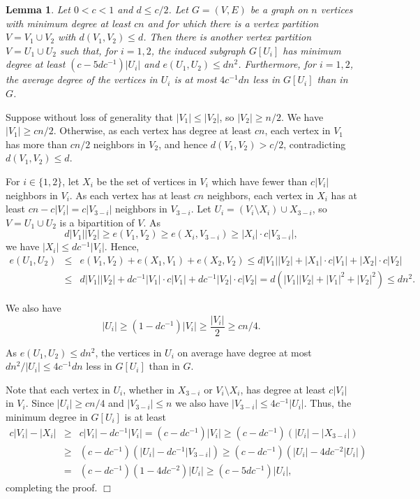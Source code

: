 \documentclass[11pt]{article}
\newtheorem{lemma}[theorem]{Lemma}
\newenvironment{proof}
      {\medskip\noindent{\bf Proof:}\hspace{1mm}}
      {\hfill$\Box$\medskip}
\begin{document}
\begin{lemma}\label{keylong}
Let $0<c<1$ and $d \leq c/2$. Let $G=(V,E)$ be a graph on $n$ vertices with minimum degree at least $cn$ and for which there is a vertex partition $V=V_1 \cup V_2$ with $d(V_1,V_2) \leq d$. Then there is another vertex partition $V=U_1 \cup U_2$ such that, for $i=1,2$, the induced subgraph $G[U_i]$ has minimum degree at least $(c-5dc^{-1})|U_i|$ and $e(U_1,U_2) \leq dn^2$. Furthermore, for $i = 1,2$, the average degree of the vertices in $U_i$ is at most $4c^{-1}dn$ less in $G[U_i]$ than in $G$.
\end{lemma}
\begin{proof}
Suppose without loss of generality that $|V_1| \leq |V_2|$, so $|V_2| \geq n/2$. We have $|V_1| \geq cn/2$. Otherwise, as each vertex has degree at least $cn$, each vertex in $V_1$ has more than $cn/2$ neighbors in $V_2$, and hence $d(V_1,V_2)>c/2$, contradicting $d(V_1,V_2) \leq d$.

For $i \in \{1,2\}$, let $X_i$ be the set of vertices in $V_i$ which have fewer than $c|V_i|$ neighbors in $V_{i}$. As each vertex has at least $cn$ neighbors, each vertex in $X_i$ has at least $cn-c|V_i|=c|V_{3-i}|$ neighbors in $V_{3-i}$. Let $U_i=(V_i\setminus X_i) \cup X_{3-i}$, so $V=U_1 \cup U_2$ is a bipartition of $V$. As
$$d|V_1||V_2| \geq e(V_1,V_2) \geq e(X_i,V_{3-i}) \geq |X_i| \cdot c |V_{3-i}|,$$ we have
$|X_i| \leq dc^{-1}|V_i|$. Hence, \begin{eqnarray*}e(U_1,U_2) & \leq &e(V_1,V_2)+e(X_1,V_1)+e(X_2,V_2) \leq d|V_1||V_2|+|X_1|\cdot c |V_1|+|X_2| \cdot c |V_2| \\ & \leq & d|V_1||V_2|+dc^{-1}|V_1| \cdot c |V_1|+dc^{-1}|V_2| \cdot c |V_2| = d(|V_1||V_2|+|V_1|^2+|V_2|^2) \leq dn^2.
\end{eqnarray*}

We also have $$|U_i| \geq \left(1-dc^{-1}\right)|V_i| \geq \frac{|V_i|}{2} \geq cn/4.$$

As $e(U_1,U_2) \leq dn^2$, the vertices in $U_i$ on average have degree at most $dn^2/|U_i| \leq 4c^{-1}dn$ less in $G[U_i]$ than in $G$.

Note that each vertex in $U_i$, whether in $X_{3-i}$ or $V_i \setminus X_i$, has degree at least $c|V_{i}|$ in $V_{i}$. 
Since $|U_i| \geq cn/4$ and $|V_{3-i}|\leq n$ we also have $|V_{3-i}|\leq 4c^{-1}|U_i|$.
Thus, the minimum degree in $G[U_i]$ is at least
\begin{eqnarray*} c|V_i|-|X_i| & \geq & c|V_i|-dc^{-1}|V_i| = (c-dc^{-1})|V_i| \geq  (c-dc^{-1})\left(|U_i|-|X_{3-i}|\right) \\ & \geq &   (c-dc^{-1})\left(|U_i|-dc^{-1}|V_{3-i}|\right) \geq
 (c-dc^{-1})\left(|U_i|-4dc^{-2}|U_{i}|\right) \\ & = & (c-dc^{-1})(1-4dc^{-2})|U_i| \geq  (c-5dc^{-1})|U_i|,\end{eqnarray*}
 completing the proof.
\end{proof}
\end{document}
